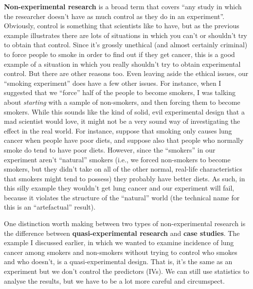\documentclass[
  a4paper,
]{book}
\begin{document}
\textbf{Non-experimental research} is a broad term that covers ``any
study in which the researcher doesn't have as much control as they do in
an experiment''. Obviously, control is something that scientists like to
have, but as the previous example illustrates there are lots of
situations in which you can't or shouldn't try to obtain that control.
Since it's grossly unethical (and almost certainly criminal) to force
people to smoke in order to find out if they get cancer, this is a good
example of a situation in which you really shouldn't try to obtain
experimental control. But there are other reasons too. Even leaving
aside the ethical issues, our ``smoking experiment'' does have a few
other issues. For instance, when I suggested that we ``force'' half of
the people to become smokers, I was talking about \emph{starting} with a
sample of non-smokers, and then forcing them to become smokers. While
this sounds like the kind of solid, evil experimental design that a mad
scientist would love, it might not be a very sound way of investigating
the effect in the real world. For instance, suppose that smoking only
causes lung cancer when people have poor diets, and suppose also that
people who normally smoke do tend to have poor diets. However, since the
``smokers'' in our experiment aren't ``natural'' smokers (i.e., we
forced non-smokers to become smokers, but they didn't take on all of the
other normal, real-life characteristics that smokers might tend to
possess) they probably have better diets. As such, in this silly example
they wouldn't get lung cancer and our experiment will fail, because it
violates the structure of the ``natural'' world (the technical name for
this is an ``artefactual'' result).

One distinction worth making between two types of non-experimental
research is the difference between \textbf{quasi-experimental research}
and \textbf{case studies}. The example I discussed earlier, in which we
wanted to examine incidence of lung cancer among smokers and non-smokers
without trying to control who smokes and who doesn't, is a
quasi-experimental design. That is, it's the same as an experiment but
we don't control the predictors (IVs). We can still use statistics to
analyse the results, but we have to be a lot more careful and
circumspect.
\end{document}
